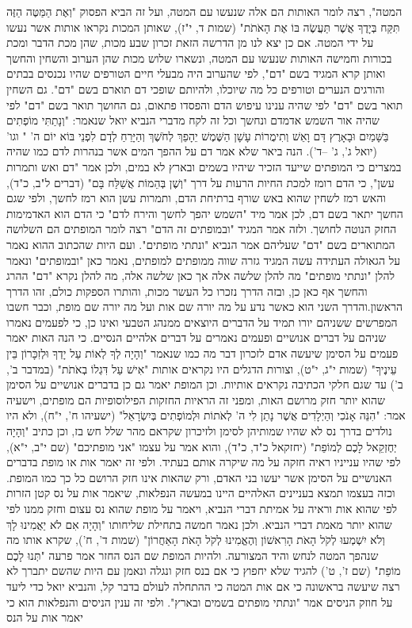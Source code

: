 \documentclass[12pt, openany]{book}
\begin{document}
המטה", רצה לומר האותות הם אלה שנעשו עם המטה, ועל זה הביא הפסוק "וְאֶת הַמַּטֶּה הַזֶּה תִּקַּח בְּיָדֶךָ אֲשֶׁר תַּעֲשֶׂה בּוֹ אֶת הָאֹתֹת" (שמות ד, י"ז), שאותן המכות נקראו אותות אשר נעשו על ידי המטה. אם כן יצא לנו מן הדרשה הזאת זכרון שבע מכות, שהן מכת הדבר ומכת בכורות וחמישה האותות שנעשו עם המטה, ונשארו שלוש מכות שהן הערוב והשחין והחשך ואותן קרא המגיד בשם "דם", לפי שהערוב היה מבעלי חיים הטורפים שהיו נכנסים בבתים והורגים הנערים וטורפים כל מה שיוכלו, ולהיותם שופכי דם תוארם בשם "דם". גם השחין תואר בשם "דם" לפי שהיה ענינו עיפוש הדם והפסדו פתאום, גם החושך תואר בשם "דם" לפי שהיה אור השמש אדמדם ונחשך וכל זה לקח מדברי הנביא יואל שנאמר: "וְנָתַתִּי מוֹפְתִים בַּשָּׁמַיִם וּבָאָרֶץ דָּם וָאֵשׁ וְתִימֲרוֹת עָשָׁן הַשֶּׁמֶשׁ יֵהָפֵךְ לְחֹשֶׁךְ וְהַיָּרֵחַ לְדָם לִפְנֵי בּוֹא יוֹם ה' " וגו' (יואל ג', ג' –ד'). הנה ביאר שלא אמר דם על ההפך המים אשר בנהרות לדם כמו שהיה במצרים כי המופתים שייעד הזכיר שיהיו בשמים ובארץ לא במים, ולכן אמר "דם ואש ותמרות עשן", כי הדם רומז למכת החיות הרעות על דרך "וְשֶׁן בְּהֵמוֹת אֲשַׁלַּח בָּם" (דברים ל"ב, כ"ד), והאש רמז לשחין שהוא באש שורף ברתיחת הדם, ותמרות עשן הוא רמז לחשך, ולפי שגם החשך יתאר בשם דם, לכן אמר מיד "השמש יהפך לחשך והירח לדם" כי הדם הוא האדמימות החזק הנוטה לחושך. ולזה אמר המגיד "ובמופתים זה הדם" רצה לומר המופתים הם השלושה המתוארים בשם "דם" שעליהם אמר הנביא "ונתתי מופתים". ועם היות שהכתוב ההוא נאמר על הגאולה העתידה עשה המגיד גזרה שווה ממופתים למופתים, נאמר כאן "ובמופתים" ונאמר להלן "ונתתי מופתים" מה להלן שלשה אלה אך כאן שלשה אלה, מה להלן נקרא "דם" ההרג והחשך אף כאן כן, ובזה הדרך נזכרו כל העשר מכות, והותרו הספקות כולם, זהו הדרך הראשון.והדרך השני הוא כאשר נדע על מה יורה שם אות ועל מה יורה שם מופת, וכבר חשבו המפרשים ששניהם יורו תמיד על הדברים היוצאים ממנהג הטבעי ואינו כן, כי לפעמים נאמרו שניהם על דברים אנושיים ופעמים נאמרים על דברים אלהיים הנסיים. כי הנה האות יאמר פעמים על הסימן שיעשה אדם לזכרון דבר מה כמו שנאמר "וְהָיָה לְךָ לְאוֹת עַל יָדְךָ וּלְזִכָּרוֹן בֵּין עֵינֶיךָ" (שמות י"ג, י"ט), וצורות הדגלים היו נקראים אותות "אִישׁ עַל דִּגְלוֹ בְאֹתֹת" (במדבר ב', ב') עד שגם חלקי הכתיבה נקראים אותיות. וכן המופת יאמר גם כן בדברים אנושיים על הסימן שהוא יותר חזק מרושם האות, ומפני זה הראיות החזקות הפילוסופיות הם מופתים, וישעיה אמר: "הִנֵּה אָנֹכִי וְהַיְלָדִים אֲשֶׁר נָתַן לִי ה' לְאֹתוֹת וּלְמוֹפְתִים בְּיִשְׂרָאֵל" (ישעיהו ח', י"ח), ולא היו נולדים בדרך נס לא שהיו שמותיהן לסימן ולזיכרון שקראם מהר שלל חש בז, וכן כתיב "וְהָיָה יְחֶזְקֵאל לָכֶם לְמוֹפֵת" (יחזקאל כ"ד, כ"ד), והוא אמר על עצמו "אני מופתיכם" (שם י"ב, י"א), לפי שהיו ענייניו ראיה חזקה על מה שיקרה אותם בעתיד. ולפי זה יאמר אות או מופת בדברים האנושיים על הסימן אשר יעשו בני האדם, ורק שהאות אינו חזק הרושם כל כך כמו המופת. וכזה בעצמו תמצא בעניינים האלהיים היינו במעשה הנפלאות, שיאמר אות על נס קטן הזרות לפי שהוא אות וראיה על אמיתת דברי הנביא, ויאמר על מופת שהוא נס עצום וחזק ממנו לפי שהוא יותר מאמת דברי הנביא. ולכן נאמר חמשה בתחילת שליחותו "וְהָיָה אִם לֹא יַאֲמִינוּ לָךְ וְלֹא יִשְׁמְעוּ לְקֹל הָאֹת הָרִאשׁוֹן וְהֶאֱמִינוּ לְקֹל הָאֹת הָאַחֲרוֹן" (שמות ד', ח'), שקרא אותו מה שנהפך המטה לנחש והיד המצורעה. ולהיות המופת שם הנס החזר אמר פרעה "תְּנוּ לָכֶם מוֹפֵת" (שם ז', ט') להגיד שלא יחפוץ כי אם בנס חזק ונגלה ונאמן עם היות שהשם יתברך לא רצה שיעשה בראשונה כי אם אות המטה כי ההתחלה לעולם בדבר קל, והנביא יואל כדי ליעד על חוזק הניסים אמר "ונתתי מופתים בשמים ובארץ". ולפי זה ענין הניסים והנפלאות הוא כי יאמר אות על הנס 
\end{document}
